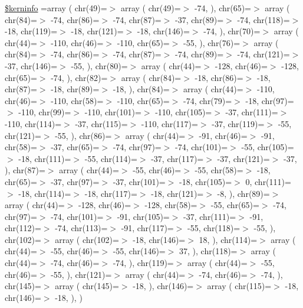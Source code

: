 \begin{DoxyCompactItemize}
\hyperlink{chelvetica_8php_ab4bb7d3b0332c517f6a42a1924f01000}{\$kerninfo} =array ( chr(49)=$>$ array ( chr(49)=$>$ -\/74, ), chr(65)=$>$ array ( chr(84)=$>$ -\/74, chr(86)=$>$ -\/74, chr(87)=$>$ -\/37, chr(89)=$>$ -\/74, chr(118)=$>$ -\/18, chr(119)=$>$ -\/18, chr(121)=$>$ -\/18, chr(146)=$>$ -\/74, ), chr(70)=$>$ array ( chr(44)=$>$ -\/110, chr(46)=$>$ -\/110, chr(65)=$>$ -\/55, ), chr(76)=$>$ array ( chr(84)=$>$ -\/74, chr(86)=$>$ -\/74, chr(87)=$>$ -\/74, chr(89)=$>$ -\/74, chr(121)=$>$ -\/37, chr(146)=$>$ -\/55, ), chr(80)=$>$ array ( chr(44)=$>$ -\/128, chr(46)=$>$ -\/128, chr(65)=$>$ -\/74, ), chr(82)=$>$ array ( chr(84)=$>$ -\/18, chr(86)=$>$ -\/18, chr(87)=$>$ -\/18, chr(89)=$>$ -\/18, ), chr(84)=$>$ array ( chr(44)=$>$ -\/110, chr(46)=$>$ -\/110, chr(58)=$>$ -\/110, chr(65)=$>$ -\/74, chr(79)=$>$ -\/18, chr(97)=$>$ -\/110, chr(99)=$>$ -\/110, chr(101)=$>$ -\/110, chr(105)=$>$ -\/37, chr(111)=$>$ -\/110, chr(114)=$>$ -\/37, chr(115)=$>$ -\/110, chr(117)=$>$ -\/37, chr(119)=$>$ -\/55, chr(121)=$>$ -\/55, ), chr(86)=$>$ array ( chr(44)=$>$ -\/91, chr(46)=$>$ -\/91, chr(58)=$>$ -\/37, chr(65)=$>$ -\/74, chr(97)=$>$ -\/74, chr(101)=$>$ -\/55, chr(105)=$>$ -\/18, chr(111)=$>$ -\/55, chr(114)=$>$ -\/37, chr(117)=$>$ -\/37, chr(121)=$>$ -\/37, ), chr(87)=$>$ array ( chr(44)=$>$ -\/55, chr(46)=$>$ -\/55, chr(58)=$>$ -\/18, chr(65)=$>$ -\/37, chr(97)=$>$ -\/37, chr(101)=$>$ -\/18, chr(105)=$>$ 0, chr(111)=$>$ -\/18, chr(114)=$>$ -\/18, chr(117)=$>$ -\/18, chr(121)=$>$ -\/8, ), chr(89)=$>$ array ( chr(44)=$>$ -\/128, chr(46)=$>$ -\/128, chr(58)=$>$ -\/55, chr(65)=$>$ -\/74, chr(97)=$>$ -\/74, chr(101)=$>$ -\/91, chr(105)=$>$ -\/37, chr(111)=$>$ -\/91, chr(112)=$>$ -\/74, chr(113)=$>$ -\/91, chr(117)=$>$ -\/55, chr(118)=$>$ -\/55, ), chr(102)=$>$ array ( chr(102)=$>$ -\/18, chr(146)=$>$ 18, ), chr(114)=$>$ array ( chr(44)=$>$ -\/55, chr(46)=$>$ -\/55, chr(146)=$>$ 37, ), chr(118)=$>$ array ( chr(44)=$>$ -\/74, chr(46)=$>$ -\/74, ), chr(119)=$>$ array ( chr(44)=$>$ -\/55, chr(46)=$>$ -\/55, ), chr(121)=$>$ array ( chr(44)=$>$ -\/74, chr(46)=$>$ -\/74, ), chr(145)=$>$ array ( chr(145)=$>$ -\/18, ), chr(146)=$>$ array ( chr(115)=$>$ -\/18, chr(146)=$>$ -\/18, ), )
\end{DoxyCompactItemize}


